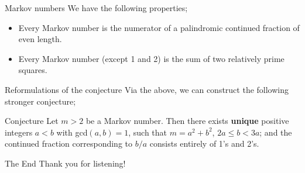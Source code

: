 \documentclass{beamer}
\begin{document}
\begin{frame}{Markov numbers}
We have the following properties; \pause
\begin{itemize}
    \item Every Markov number is the numerator of a palindromic continued fraction of even length. \pause
    \item Every Markov number (except 1 and 2) is the sum of two relatively prime squares.
\end{itemize}
\end{frame}
\begin{frame}{Reformulations of the conjecture}
    Via the above, we can construct the following stronger conjecture; \pause
    \begin{block}{Conjecture}
        Let $m > 2$ be a Markov number. Then there exists \textbf{unique} positive integers $a < b$ with gcd$(a,b) = 1$, such that $m = a^2 + b^2$, $2a \leq b < 3a$; and the continued fraction corresponding to $b/a$ consists entirely of 1's and 2's.
    \end{block}
\end{frame}

\begin{frame}{The End}
    Thank you for listening!

\end{frame}
\end{document}
